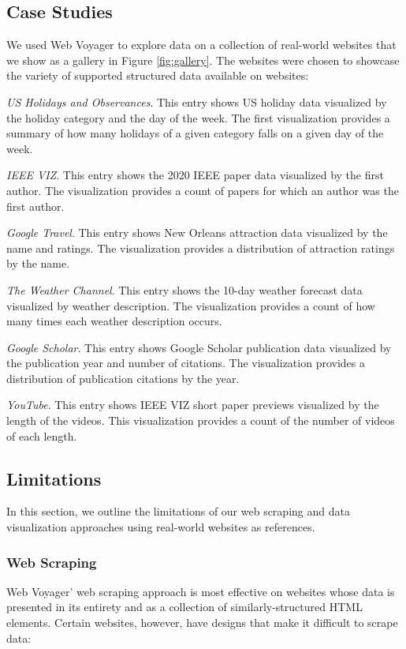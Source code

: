 \documentclass{vgtc}                          %
\begin{document}
\subsection{Case Studies}

We used Web Voyager to explore data on a collection of real-world
websites that we show as a gallery in Figure \ref{fig:gallery}. The websites were chosen to showcase
the variety of supported structured data available on websites:

\emph{US Holidays and Observances}. This entry shows US holiday data visualized by the holiday category
and the day of the week. The first visualization provides a summary of how many holidays of a 
given category falls on a given day of the week.

\emph{IEEE VIZ}. This entry shows the 2020 IEEE paper data visualized by the first author. The
visualization provides a count of papers for which an author was the first author.

\emph{Google Travel}. This entry shows New Orleans attraction data visualized by the name and ratings. The
visualization provides a distribution of attraction ratings by the name.

\emph{The Weather Channel}. This entry shows the 10-day weather forecast data visualized by weather description. The
visualization provides a count of how many times each weather description occurs.

\emph{Google Scholar}. This entry shows Google Scholar publication data visualized by the publication year and
number of citations. The visualization provides a distribution of publication citations by the year.

\emph{YouTube}. This entry shows IEEE VIZ short paper previews visualized by the length of the videos. This visualization
provides a count of the number of videos of each length.

\subsection{Limitations}

In this section, we outline the limitations of our web scraping and data
visualization approaches using real-world websites as references.

\subsubsection{Web Scraping}

Web Voyager' web scraping approach is most effective on websites whose
data is presented in its entirety and as a collection of similarly-structured HTML elements.
Certain websites, however, have designs that make it difficult to scrape
data:
\end{document}

